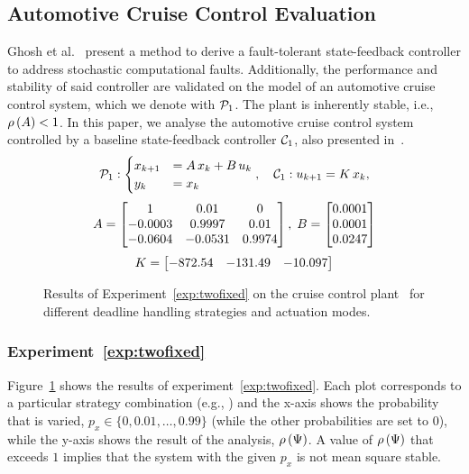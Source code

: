 \subsection{Automotive Cruise Control Evaluation}%
\label{sec:samarjit}

Ghosh et al.~\cite{Ghosh:2018} present a method to derive a fault-tolerant state-feedback controller to address stochastic computational faults.
Additionally, the performance and stability of said controller are validated on the model of an automotive cruise control system, which we denote with $\mathcal{P}_1$.
The plant is inherently stable, i.e., $\rho\left( A \right) < 1$.
In this paper, we analyse the automotive cruise control system controlled by a baseline state-feedback controller $\mathcal{C}_1$, also presented in~\cite{Ghosh:2018}.
%
\begin{equation*}%
    \plant_1: \begin{cases}
        x_{k+1} &= \Ap\,x_k+\Bp\, u_k\\
        y_k &= x_k
    \end{cases}, \quad
    \ctrler_1: u_{k+1} = \Dc\,x_k,
\end{equation*}
\begin{equation*}
    A = \begin{bmatrix}
        1 & 0.01 & 0 \\
        -0.0003 & 0.9997 & 0.01 \\
        -0.0604 & -0.0531 & 0.9974
    \end{bmatrix}, \; B = \begin{bmatrix}
        0.0001 \\
        0.0001 \\
        0.0247
    \end{bmatrix}
\end{equation*}
\begin{equation*}%
    \Dc = \begin{bmatrix}
        -872.54 & -131.49 & -10.097
    \end{bmatrix}
\end{equation*}

\begin{figure}[t]
    \centering
    \caption{Results of Experiment~\ref{exp:twofixed} on the cruise control plant~\cite{Ghosh:2018} for different deadline handling strategies and actuation modes.}
    \label{fig:samarjit-fix2}
\end{figure}

\subsubsection*{Experiment~\ref{exp:twofixed}}%
%
Figure~\ref{fig:samarjit-fix2} shows the results of experiment~\ref{exp:twofixed}.
Each plot corresponds to a particular strategy combination (e.g., \tKZ{}) and the x-axis shows the probability that is varied, $p_x \in \{0,0.01,\dots,0.99\}$ (while the other probabilities are set to $0$), while the y-axis shows the result of the analysis, $\rho\left( \Psi \right)$.
A value of $\rho\left( \Psi \right)$ that exceeds $1$ implies that the system with the given $p_x$ is not mean square stable.

